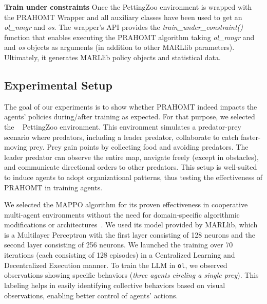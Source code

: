 \documentclass[sigconf,anonymous]{aamas}
\begin{document}
\textbf{Train under constraints} \quad Once the PettingZoo environment is wrapped with the PRAHOMT Wrapper and all auxiliary classes have been used to get an \textit{ol\_mngr} and \textit{os}. The wrapper's API provides the \textit{train\_under\_constraint()} function that enables executing the PRAHOMT algorithm taking \textit{ol\_mngr} and and \textit{os} objects as arguments (in addition to other MARLlib parameters). Ultimately, it generates MARLlib policy objects and statistical data.


\subsection{Experimental Setup}

The goal of our experiments is to show whether PRAHOMT indeed impacts the agents' policies during/after training as expected. For that purpose, we selected the ~\cite{Lowe2017} PettingZoo environment. This environment simulates a predator-prey scenario where predators, including a leader predator, collaborate to catch faster-moving prey. Prey gain points by collecting food and avoiding predators. The leader predator can observe the entire map, navigate freely (except in obstacles), and communicate directional orders to other predators. This setup is well-suited to induce agents to adopt organizational patterns, thus testing the effectiveness of PRAHOMT in training agents.



We selected the MAPPO algorithm for its proven effectiveness in cooperative multi-agent environments without the need for domain-specific algorithmic modifications or architectures~\cite{Yu2022}. We used its model provided by MARLlib, which is a Multilayer Perceptron with the first layer consisting of 128 neurons and the second layer consisting of 256 neurons. We launched the training over 70 iterations (each consisting of 128 episodes) in a Centralized Learning and Decentralized Execution manner.
%
To train the LLM in \texttt{ol}, we observed observations showing specific behaviors (\textit{three agents circling a single prey}). This labeling helps in easily identifying collective behaviors based on visual observations, enabling better control of agents' actions.
\end{document}
